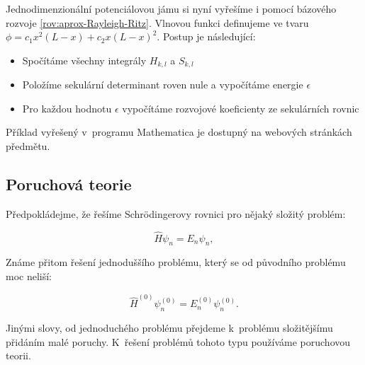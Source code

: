 \begin{priklad}
Jednodimenzionální potenciálovou jámu si nyní vyřešíme i pomocí bázového rozvoje \ref{rov:aprox-Rayleigh-Ritz}. Vlnovou funkci definujeme ve tvaru $ \phi=c_1x^2(L-x)+c_2x(L-x)^2 $. Postup je následující:

\begin{itemize}

\item Spočítáme všechny integrály $H_{k,l}$ a $S_{k,l}$
\item Položíme sekulární determinant roven nule a vypočítáme energie $\epsilon$
\item Pro každou hodnotu $\epsilon$ vypočítáme rozvojové koeficienty ze sekulárních rovnic

\end{itemize}

Příklad vyřešený v~programu Mathematica je dostupný na webových stránkách předmětu.

\end{priklad} 
 
\subsection{Poruchová teorie}
\label{kap:PoruchovaTeorie}
 
Předpokládejme, že řešíme Schrödingerovy rovnici pro nějaký složitý problém:

\begin{equation}
\hat{H}\psi_n=E_n \psi_n,
\end{equation}


\noindent Známe přitom řešení jednoduššího problému, který se od původního problému moc neliší:
 
\begin{equation}
\hat{H}^{(0)}\psi_n^{(0)}=E_n^{(0)} \psi_n^{(0)}.
\end{equation}
 
\noindent Jinými slovy, od jednoduchého problému přejdeme k~problému složitějšímu přidáním malé poruchy. K~řešení problémů tohoto typu používáme poruchovou teorii.
 
